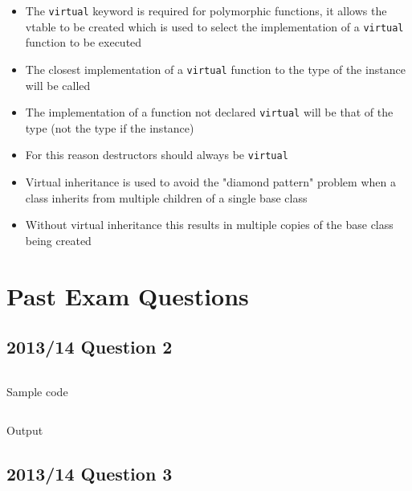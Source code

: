 \documentclass[a4paper]{article}
\begin{document}
\begin{itemize}
  \item
    The \texttt{virtual} keyword is required for polymorphic functions, it
    allows the vtable to be created which is used to select the implementation
    of a \texttt{virtual} function to be executed

  \item
    The closest implementation of a \texttt{virtual} function to the type of the
    instance will be called

  \item
    The implementation of a function not declared \texttt{virtual} will be that
    of the type (not the type if the instance)

  \item
    For this reason destructors should always be \texttt{virtual}

  \item
    Virtual inheritance is used to avoid the "diamond pattern" problem when a
    class inherits from multiple children of a single base class

  \item
    Without virtual inheritance this results in multiple copies of the base
    class being created

\end{itemize}

\section{Past Exam Questions}

\subsection{2013/14 Question 2}

\begin{listing}[h!]
  \inputminted[linenos,frame=lines]{cpp}{listings/csc8501_pp1314_q2.cpp}
  \caption{Sample code}
  \label{listing:csc8501_pp1314_q2}
\end{listing}
\FloatBarrier

\begin{listing}[h!]
  \inputminted[linenos,frame=lines]{text}{out/csc8501_pp1314_q2.txt}
  \caption{Output}
  \label{listing:csc8501_pp1314_q2_o}
\end{listing}
\FloatBarrier

\subsection{2013/14 Question 3}
\end{document}
